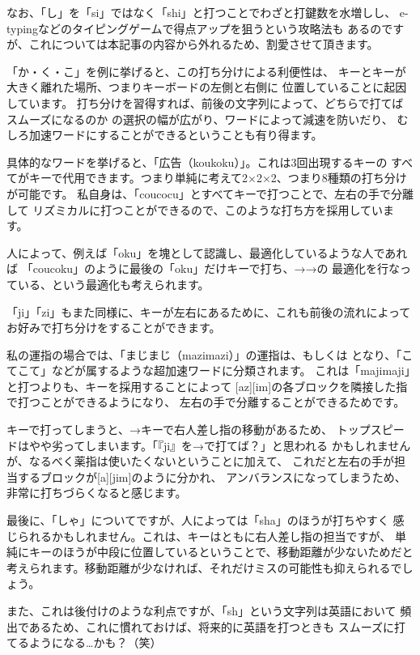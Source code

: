 なお、「し」を「si」ではなく「shi」と打つことでわざと打鍵数を水増しし、
e-typingなどのタイピングゲームで得点アップを狙うという攻略法も
あるのですが、これについては本記事の内容から外れるため、割愛させて頂きます。


「か・く・こ」を例に挙げると、この打ち分けによる利便性は、
キーとキーが大きく離れた場所、つまりキーボードの左側と右側に
位置していることに起因しています。
打ち分けを習得すれば、前後の文字列によって、どちらで打てばスムーズになるのか
の選択の幅が広がり、ワードによって減速を防いだり、
むしろ加速ワードにすることができるということも有り得ます。


具体的なワードを挙げると、「広告（koukoku）」。これは3回出現するキーの
すべてがキーで代用できます。つまり単純に考えて2×2×2、つまり8種類の打ち分けが可能です。
私自身は、「coucocu」とすべてキーで打つことで、左右の手で分離して
リズミカルに打つことができるので、このような打ち方を採用しています。

人によって、例えば「oku」を塊として認識し、最適化しているような人であれば
「coucoku」のように最後の「oku」だけキーで打ち、→→の
最適化を行なっている、という最適化も考えられます。


「ji」「zi」もまた同様に、キーが左右にあるために、これも前後の流れによって
お好みで打ち分けをすることができます。

私の運指の場合では、「まじまじ（mazimazi）」の運指は、もしくは
となり、「こてこて」などが属するような超加速ワードに分類されます。
これは「majimaji」と打つよりも、キーを採用することによって
[az][im]の各ブロックを隣接した指で打つことができるようになり、
左右の手で分離することができるためです。

キーで打ってしまうと、→キーで右人差し指の移動があるため、
トップスピードはやや劣ってしまいます。「『ji』を→で打てば？」と思われる
かもしれませんが、なるべく薬指は使いたくないということに加えて、
これだと左右の手が担当するブロックが[a][jim]のように分かれ、
アンバランスになってしまうため、非常に打ちづらくなると感じます。


最後に、「しゃ」についてですが、人によっては「sha」のほうが打ちやすく
感じられるかもしれません。これは、キーはともに右人差し指の担当ですが、
単純にキーのほうが中段に位置しているということで、移動距離が少ないためだと
考えられます。移動距離が少なければ、それだけミスの可能性も抑えられるでしょう。

また、これは後付けのような利点ですが、「sh」という文字列は英語において
頻出であるため、これに慣れておけば、将来的に英語を打つときも
スムーズに打てるようになる…かも？（笑）


